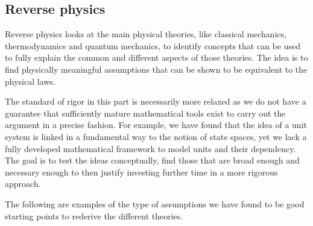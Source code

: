 \documentclass[11pt,letterpaper,fleqn]{memoir} %
\begin{document}
\subsection{Reverse physics}

Reverse physics looks at the main physical theories, like classical mechanics, thermodynamics and quantum mechanics, to identify concepts that can be used to fully explain the common and different aspects of those theories. The idea is to find physically meaningful assumptions that can be shown to be equivalent to the physical laws.

The standard of rigor in this part is necessarily more relaxed as we do not have a guarantee that sufficiently mature mathematical tools exist to carry out the argument in a precise fashion. For example, we have found that the idea of a unit system is linked in a fundamental way to the notion of state spaces, yet we lack a fully developed mathematical framework to model units and their dependency. The goal is to test the ideas conceptually, find those that are broad enough and necessary enough to then justify investing further time in a more rigorous approach.

The following are examples of the type of assumptions we have found to be good starting points to rederive the different theories.
\end{document}
